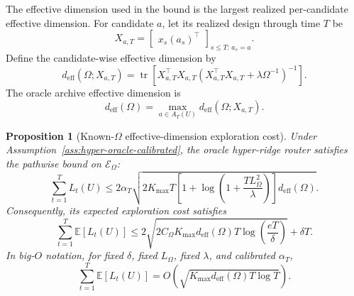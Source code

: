 \documentclass{article} %
\newtheorem{proposition}[theorem]{Proposition}
\begin{document}
The effective dimension used in the bound is the largest realized per-candidate effective dimension.  For candidate \(a\), let its realized design through time \(T\) be
\begin{equation}
\label{eq:hyper-oracle-XaT}
X_{a,T}
=
\begin{bmatrix}
x_s(a_s)^\top
\end{bmatrix}_{s\le T:\,a_s=a}.
\end{equation}
Define the candidate-wise effective dimension by
\begin{equation}
\label{eq:hyper-oracle-deff-a}
d_{\mathrm{eff}}(\Omega;X_{a,T})
=
\operatorname{tr}
\!\left[
X_{a,T}^{\top}X_{a,T}
\left(
X_{a,T}^{\top}X_{a,T}+\lambda\Omega^{-1}
\right)^{-1}
\right].
\end{equation}
The oracle archive effective dimension is
\begin{equation}
\label{eq:hyper-oracle-deff-max}
d_{\mathrm{eff}}(\Omega)
=
\max_{a\in A_T(U)}
d_{\mathrm{eff}}(\Omega;X_{a,T}).
\end{equation}

\begin{proposition}[Known-\(\Omega\) effective-dimension exploration cost]
\label{prop:deff-bound-app}
Under Assumption~\ref{ass:hyper-oracle-calibrated}, the oracle hyper-ridge router satisfies the pathwise bound on \(\mathcal{E}_{\Omega}\):
\begin{equation}
\label{eq:hyper-deff-bound-pathwise}
\sum_{t=1}^{T}L_t(U)
\le
2\alpha_T
\sqrt{
2K_{\max}T
\left[
1+\log\!\left(1+\frac{TL_{\Omega}^{2}}{\lambda}\right)
\right]
d_{\mathrm{eff}}(\Omega)
}.
\end{equation}
Consequently, its expected exploration cost satisfies
\begin{equation}
\label{eq:hyper-deff-bound-expectation}
\sum_{t=1}^{T}\mathbb{E}[L_t(U)]
\le
2\sqrt{
2C_{\Omega}
K_{\max}
d_{\mathrm{eff}}(\Omega)
T
\log\!\left(\frac{eT}{\delta}\right)
}
+
\delta T .
\end{equation}
In big-\(O\) notation, for fixed \(\delta\), fixed \(L_{\Omega}\), fixed \(\lambda\), and calibrated \(\alpha_T\),
\begin{equation}
\label{eq:hyper-deff-bound-rate}
\sum_{t=1}^{T}\mathbb{E}[L_t(U)]
=
O\!\left(
\sqrt{
K_{\max}
d_{\mathrm{eff}}(\Omega)
T
\log T
}
\right).
\end{equation}
\end{proposition}
\end{document}

